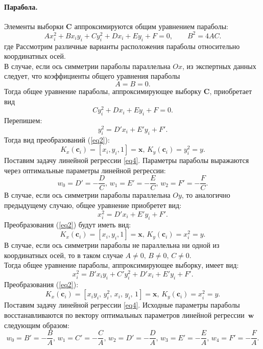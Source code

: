\documentclass[12pt, twoside]{article}
\numberwithin{equation}{section}
\begin{document}
\paragraph{Парабола.} Элементы выборки $\mathbf{C}$ аппроксимируются общим уравнением параболы: 
\begin{equation} 
\label{24}
Ax_i^2 + Bx_iy_i + Cy_i^2 + Dx_i + Ey_i + F = 0, \qquad B^2 = 4AC.
\end{equation} где 
Рассмотрим различные варианты расположения параболы относительно координатных осей. \\
В случае, если ось симметрии параболы параллельна $Ox$, из экспертных данных следует, что коэффициенты общего уравнения параболы 
\begin{equation}
\label{25}
A = B = 0.
\end{equation}
Тогда общее уравнение параболы, аппроксимирующее выборку $\mathbf{C}$, приобретает вид \begin{equation}Cy_i^2 + Dx_i + Ey_i + F = 0 .\end{equation}
Перепишем: \begin{equation}y_i^2 = D'x_i + E'y_i + F'.\end{equation}
Тогда вид преобразований (\ref{eq2}): \begin{equation}K_{x}(\mathbf{c}_i) = [x_i, y_i, 1] = \mathbf{x}, \,  K_{y}(\mathbf{c}_i) = y_i^2 = y. \end{equation} 
Поставим задачу линейной регрессии \eqref{eq4}.
Параметры параболы выражаются через оптимальные параметры линейной регрессии: \begin{equation} w_0 = D' = -\frac{D}{C}, \,  w_1 = E' = -\frac{E}{C}, \,  w_2 = F' = -\frac{F}{C}.\end{equation}
В случае, если ось симметрии параболы параллельна $Oy$, то аналогично предыдущему случаю, общее уравнение приобретет вид: \begin{equation} x_i^2  = D'x_i + E'y_i + F'.\end{equation}
Преобразования (\ref{eq2}) будут иметь вид: \begin{equation}K_{x}(\mathbf{c}_i) = [x_i, y_i, 1] = \mathbf{x}, \,  K_{y}(\mathbf{c}_i) = x_i^2 = y. \end{equation}
В случае, если ось симметрии параболы не параллельна ни одной из координатных осей, то в таком случае $A \neq 0, \, B \neq 0, \, C \neq 0$. \\
Тогда общее уравнение параболы, аппроксимирующее выборку, имеет вид: \begin{equation} x_i^2 = B'x_iy_i + C'y_i^2 + D'x_i + E'y_i + F'.\end{equation}
Преобразования (\ref{eq2}): \begin{equation} K_{x}(\mathbf{c}_i) = [x_iy_i, \, y_i^2, \, x_i, \, y_i, \, 1] = \mathbf{x}, \,  K_{y}(\mathbf{c}_i) = x_i^2 = y.\end{equation}
Поставим задачу линейной регрессии \eqref{eq4}.
Исходные параметры параболы восстанавливаются по вектору оптимальных параметров линейной регрессии~$\mathbf{w}$ следующим образом: \begin{equation} w_0 = B' = -\frac{B}{A}, \, w_1 = C' = -\frac{C}{A}, \, w_2 = D' = -\frac{D}{A}, \, w_3 = E' = -\frac{E}{A}, \, w_4 = F' = -\frac{F}{A}.\end{equation}
\end{document}
